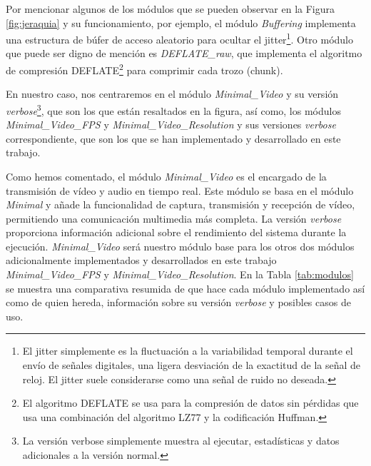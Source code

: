 Por mencionar algunos de los módulos que se pueden observar en la Figura \ref{fig:jeraquia} y su funcionamiento, por ejemplo, el módulo \textit{Buffering} implementa una estructura de búfer de acceso aleatorio para ocultar el jitter\footnote{El jitter simplemente es la fluctuación a la variabilidad temporal durante el envío de señales digitales, una ligera desviación de la exactitud de la señal de reloj. El jitter suele considerarse como una señal de ruido no deseada.}. Otro módulo que puede ser digno de mención es \textit{DEFLATE\_raw}, que implementa el algoritmo de compresión DEFLATE\footnote{El algoritmo DEFLATE se usa para la compresión de datos sin pérdidas que usa una combinación del algoritmo LZ77 y la codificación Huffman.} para comprimir cada trozo (chunk).

\vspace{\baselineskip}
En nuestro caso, nos centraremos en el módulo \textit{Minimal\_Video} y su versión \textit{verbose}\footnote{La versión verbose simplemente muestra al ejecutar, estadísticas y datos adicionales a la versión normal.}, que son los que están resaltados en la figura, así como, los módulos \textit{Minimal\_Video\_FPS} y \textit{Minimal\_Video\_Resolution} y sus versiones \textit{verbose} correspondiente, que son los que se han implementado y desarrollado en este trabajo.

\vspace{\baselineskip}
Como hemos comentado, el módulo \textit{Minimal\_Video} es el encargado de la transmisión de vídeo y audio en tiempo real. Este módulo se basa en el módulo \textit{Minimal} y añade la funcionalidad de captura, transmisión y recepción de vídeo, permitiendo una comunicación multimedia más completa. La versión \textit{verbose} proporciona información adicional sobre el rendimiento del sistema durante la ejecución. \textit{Minimal\_Video} será nuestro módulo base para los otros dos módulos adicionalmente implementados y desarrollados en este trabajo \textit{Minimal\_Video\_FPS} y \textit{Minimal\_Video\_Resolution}. En la Tabla \ref{tab:modulos} se muestra una comparativa resumida de que hace cada módulo implementado así como de quien hereda, información sobre su versión \textit{verbose} y posibles casos de uso.

